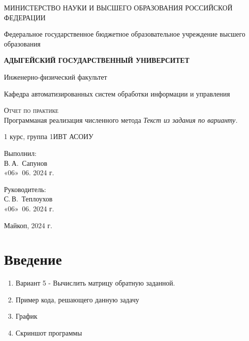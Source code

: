 \documentclass{article}
\begin{document}
	\begin{titlepage}
		\begin{center}
			\large
			МИНИСТЕРСТВО НАУКИ И ВЫСШЕГО ОБРАЗОВАНИЯ РОССИЙСКОЙ ФЕДЕРАЦИИ
			
			Федеральное государственное бюджетное образовательное учреждение высшего образования
			
			\textbf{АДЫГЕЙСКИЙ ГОСУДАРСТВЕННЫЙ УНИВЕРСИТЕТ}
			\vspace{0.25cm}
			
			Инженерно-физический факультет
			
			Кафедра автоматизированных систем обработки информации и управления
			\vfill
			
			\vfill
			
			\textsc{Отчет по практике}\\[5mm]
			
			{\LARGE Программаная реализация численного метода \textit{Текст из задания по варианту.}}
			\bigskip
			
			1 курс, группа 1ИВТ АСОИУ
		\end{center}
		\vfill
		
		\newlength{\ML}
		\hfill\begin{minipage}{0.5\textwidth}
			Выполнил:\\
			\underline{\hspace{\ML}}В.\,А.~Сапунов\\
			«06» \,06. 2024 г.
		\end{minipage}%
		\bigskip
		
		\hfill\begin{minipage}{0.5\textwidth}
			Руководитель:\\
			\underline{\hspace{\ML}} С.\,В.~Теплоухов\\
			«06» \,06. 2024 г.
		\end{minipage}%
		\vfill
		
		\begin{center}
			Майкоп, 2024 г.
		\end{center}
	\end{titlepage}
	\section{Введение}
	\label{sec:intro}
	\begin{enumerate}
		\item Вариант 5 - Вычислить матрицу обратную заданной.
		\item Пример кода, решающего данную задачу
		\item График
		\item Скриншот программы
	\end{enumerate}
	
\end{document}

